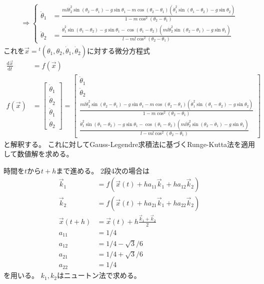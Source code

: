 \documentclass{jsarticle}
\newcommand{\eqa}[1]{\begin{align}#1\end{align}}
\newcommand{\so}{\Rightarrow}
\newcommand{\fn}[1]{\!\left(#1\right)}
\newcommand{\cost}[2]{\cos\left(\theta_{#1}-\theta_{#2}\right)}
\newcommand{\coste}[3]{\cos^{#3}\left(\theta_{#1}-\theta_{#2}\right)}
\newcommand{\sint}[2]{\sin\left(\theta_{#1}-\theta_{#2}\right)}
\newcommand{\dott}[1]{\dot{\theta}_{#1}}
\newcommand{\ddott}[1]{\ddot{\theta}_{#1}}
\begin{document}
\eqa{
	\so
	\begin{cases}
		\ddott{1} &= \frac{m l \dott{2}^2 \sint{2}{1} - g \sin\theta_1 - m \cost{2}{1}\left(\dott{1}^2 \sint{1}{2} - g \sin\theta_2\right)}{1 - m \coste{2}{1}{2}} \\
		\ddott{2} &= \frac{\dott{1}^2 \sint{1}{2} - g \sin\theta_1 - \cost{1}{2}\left(m l \dott{2}^2 \sint{2}{1} - g \sin\theta_1\right)}{l - m l \coste{2}{1}{2}}
	\end{cases}
}
これを$\vec{x}={}^t\left(\theta_1, \theta_2, \dott{1}, \dott{2}\right)$に対する微分方程式
\eqa{
	\frac{\mathrm{d}\vec{x}}{\mathrm{d}t} &= f\fn{\vec{x}} \\
	f\fn{\vec{x}} &= \begin{bmatrix}
		\dott{1} \\ \dott{2} \\ \ddott{1} \\ \dott{2}
	\end{bmatrix}
	= \begin{bmatrix}
		\dott{1} \\ \dott{2} \\
		\frac{m l \dott{2}^2 \sint{2}{1} - g \sin\theta_1 - m \cost{2}{1}\left(\dott{1}^2 \sint{1}{2} - g \sin\theta_2\right)}{1 - m \coste{2}{1}{2}} \\
		\frac{\dott{1}^2 \sint{1}{2} - g \sin\theta_1 - \cost{1}{2}\left(m l \dott{2}^2 \sint{2}{1} - g \sin\theta_1\right)}{l - m l \coste{2}{1}{2}}
	\end{bmatrix}
}
と解釈する。
これに対してGauss-Legendre求積法に基づくRunge-Kutta法を適用して数値解を求める。

時間を$t$から$t+h$まで進める。
2段4次の場合は
\eqa{
	\vec{k}_1 &= f\fn{\vec{x}\fn{t} + h a_{11} \vec{k}_1 + h a_{12} \vec{k}_2} \\
	\vec{k}_2 &= f\fn{\vec{x}\fn{t} + h a_{21} \vec{k}_1+ h a_{22} \vec{k}_2} \\
	\vec{x}\fn{t + h} &= \vec{x}\fn{t} + h \frac{\vec{k}_1 + \vec{k}_2}{2} \\
	a_{11} &= 1 / 4 \\
	a_{12} &= 1 / 4 - \sqrt{3} / 6 \\
	a_{21} &= 1 / 4 + \sqrt{3} / 6 \\
	a_{22} &= 1 / 4
}
を用いる。
$k_1, k_2$はニュートン法で求める。




\end{document}
